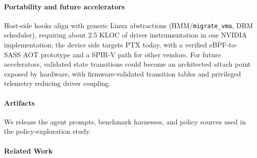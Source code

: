 \paragraph{Portability and future accelerators}
Host-side hooks align with generic Linux abstractions (HMM/\texttt{migrate\_vma}, DRM scheduler), requiring about 2.5 KLOC of driver instrumentation in our NVIDIA implementation; the device side targets PTX today, with a verified eBPF-to-SASS AOT prototype and a SPIR-V path for other vendors.
For future accelerators, validated state transitions could become an architected attach point exposed by hardware, with firmware-validated transition tables and privileged telemetry reducing driver coupling.

\paragraph{Artifacts}
We release the agent prompts, benchmark harnesses, and policy sources used in the policy-exploration study.

\paragraph{Related Work}

